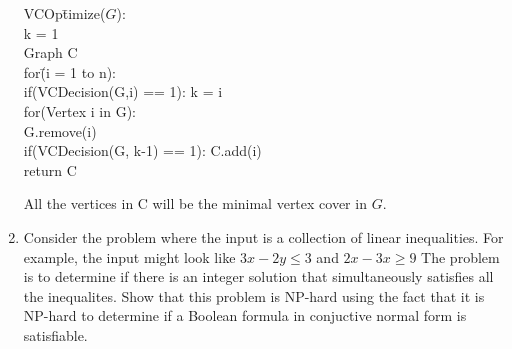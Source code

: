 \documentclass{article}
\begin{document}
\begin{enumerate}
\begin{tabbing}
VCOp\=timize($G$):\\
\>k = 1\\
\>Graph C\\
\>for\=(i = 1 to n):\\
\>\>if(VCDecision(G,i) == 1): k = i\\
\>for(Vertex i in G):\\
\>\>G.remove(i)\\
\>\>if(VCDecision(G, k-1) == 1): C.add(i)\\
\>return C\\
\end{tabbing}
All the vertices in C will be the minimal vertex cover in $G$.
\setcounter{enumi}{13}
\item Consider the problem where the input is a collection of linear inequalities. For example, the input might look like $3x-2y \le 3$ and $2x-3x \ge 9$ The problem is to determine if there is an integer solution that simultaneously satisfies all the inequalites. Show that this problem is NP-hard using the fact that it is NP-hard to determine if a Boolean formula in conjuctive normal form is satisfiable.
\newline

\end{enumerate}
\end{document}
